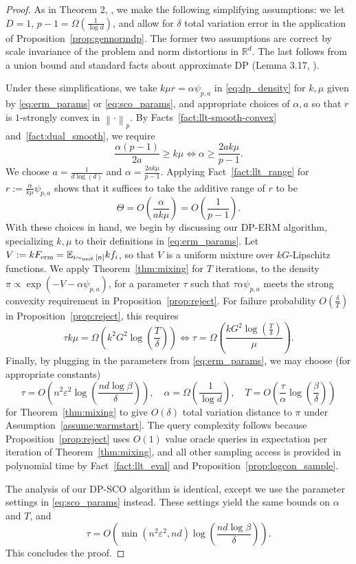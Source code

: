 \documentclass[11pt]{article}
\newcommand{\defeq}{:=}
\newcommand{\norm}[1]{\left\lVert#1\right\rVert}
\newcommand{\eps}{\epsilon}
\newcommand{\R}{\mathbb{R}}
\newcommand{\E}{\mathbb{E}}
\newcommand{\Par}[1]{\left(#1\right)}
\newcommand{\0}{\mathbf{0}}
\newcommand{\1}{\mathbf{1}}
\newcommand{\Ferm}{F_{\textup{erm}}}
\newcommand{\simu}{\sim_{\textup{unif.}}}
\renewcommand{\epsilon}{\varepsilon}
\begin{document}
\begin{proof}
As in Theorem 2, \cite{GopiLLST25}, we make the following simplifying assumptions: we let $D = 1$, $p - 1 = \Omega(\frac 1 {\log d})$, and allow for $\delta$ total variation error in the application of Proposition~\ref{prop:gennormdp}. The former two assumptions are correct by scale invariance of the problem and norm distortions in $\R^d$. The last follows from a union bound and standard facts about approximate DP (Lemma 3.17, \cite{DworkR14}). 

Under these simplifications, we take $k\mu r = \alpha \psi_{p, a}$ in \eqref{eq:dp_density} for $k, \mu$ given by \eqref{eq:erm_params} or \eqref{eq:sco_params}, and appropriate choices of $\alpha, a$ so that $r$ is $1$-strongly convex in $\norm{\cdot}_p$. By Facts~\ref{fact:llt-smooth-convex} and~\ref{fact:dual_smooth}, we require
\[\frac{\alpha(p - 1)}{2a} \ge k\mu \iff \alpha \ge \frac{2ak\mu}{p-1}. \]
We choose $a = \frac{1}{d\log(d)}$ and $\alpha = \frac{2ak\mu}{p-1}$. Applying Fact~\ref{fact:llt_range} for $r \defeq \frac{\alpha}{k\mu} \psi_{p, a}$ shows that it suffices to take the additive range of $r$ to be
\[\Theta = O\Par{\frac{\alpha}{ak\mu}} = O\Par{\frac{1}{p-1}}.\]
With these choices in hand, we begin by discussing our DP-ERM algorithm, specializing $k, \mu$ to their definitions in \eqref{eq:erm_params}. Let $V \defeq k \Ferm = \E_{i \simu [n]} kf_i$, so that $V$ is a uniform mixture over $kG$-Lipschitz functions. We apply Theorem~\ref{thm:mixing} for $T$ iterations, to the density
$\pi \propto \exp(-V - \alpha \psi_{p, a})$, 
for a parameter $\tau$ such that $\tau \alpha \psi_{p, a}$ meets the strong convexity requirement in Proposition~\ref{prop:reject}. For failure probability $O(\frac \delta T)$ in Proposition~\ref{prop:reject}, this requires
\[\tau k\mu = \Omega\Par{k^2 G^2\log\Par{\frac T \delta}} \iff \tau = \Omega\Par{\frac{k G^2 \log(\frac T \delta)}{\mu}}.\]
Finally, by plugging in the parameters from \eqref{eq:erm_params}, we may choose (for appropriate constants)
\[\tau = O\Par{n^2 \eps^2 \log\Par{\frac{nd\log\beta}{\delta}}},\quad \alpha = \Omega\Par{\frac{1}{\log d}},\quad T = O\Par{\frac \tau \alpha \log\Par{\frac \beta \delta}}\]
for Theorem~\ref{thm:mixing} to give $O(\delta)$ total variation distance to $\pi$ under Assumption~\ref{assume:warmstart}.
The query complexity follows because Proposition~\ref{prop:reject} uses $O(1)$ value oracle queries in expectation per iteration of Theorem~\ref{thm:mixing}, and all other sampling access is provided in polynomial time by Fact~\ref{fact:llt_eval} and Proposition~\ref{prop:logcon_sample}.

The analysis of our DP-SCO algorithm is identical, except we use the parameter settings in \eqref{eq:sco_params} instead. These settings yield the same bounds on $\alpha$ and $T$, and
\[\tau = O\Par{\min\Par{n^2 \eps^2, nd} \log\Par{\frac{nd\log\beta}{\delta}} }.\]
This concludes the proof.
\end{proof}
\end{document}
